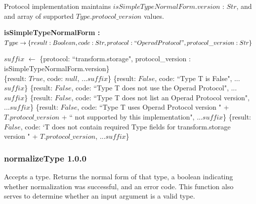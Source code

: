 \documentclass[9pt, oneside]{article}   	%
\begin{document}
Protocol implementation maintains $isSimpleTypeNormalForm.version$ : $Str$, and  and array of supported $Type.protocol\_version$ values.

\vspace{.25 cm}
\begin{algorithm}[H]
\setcounter{AlgoLine}{0}
\caption{\textbf{isSimpleTypeNormalForm : \\ $Type \rightarrow \{result: Boolean, code: Str, protocol: ``Operad Protocol", protocol\_version : Str\}$}}
\label{algo_isSimpleTypeNormalForm}
\label{alg:quad}
\SetAlgoLined
$suffix$ $\leftarrow$ \{protocol: ``transform.storage", protocol\_version : isSimpleTypeNormalForm.version\} \\
 {
	\Return \{result: $True$, code: $null$, ...$suffix$\}
	}
{
	\Return \{result: $False$, code: ``Type T is False", ...$suffix$\}
}
{
		{\Return \{result: $False$, code: ``Type T does not use the Operad Protocol", ...$suffix$\}}
		{\Return \{result: $False$, code: ``Type T does not list an Operad Protocol version", ...$suffix$\}}
		{\Return \{result: $False$, code: ``Type T uses Operad Protocol version " + $T.protocol\_version$ + `` not supported by this implementation", ...$suffix$\}}
		{\Return \{result: $False$, code: `T does not contain required Type fields for transform.storage version " + $T.protocol\_version$, ...$suffix$\}}
}
\end{algorithm}

\subsubsection{normalizeType 1.0.0}\label{normalizeType_code}

Accepts a type. Returns the normal form of that type, a boolean indicating whether normalization was successful, and an error code. This function also serves to determine whether an input argument is a valid type.
\end{document}
